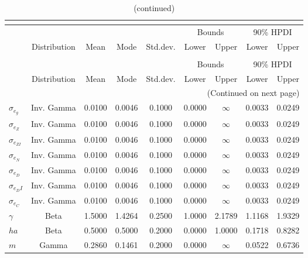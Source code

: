  
\begin{center}
\begin{longtable}{lcccccccc} 
\caption{Prior information (parameters)}\\
 \label{Table:Prior}\\
\toprule%
  &  &  &  &  & \multicolumn{2}{c}{Bounds} & \multicolumn{2}{c}{90\% HPDI} \\ 
  \cmidrule(r{.75em}){6-7} \cmidrule(r{.75em}){8-9}
  & Distribution & Mean & Mode & Std.dev. & Lower & Upper & Lower & Upper  \\ 
\midrule
\endfirsthead
\caption{(continued)}\\
 \toprule%
  &  &  &  &  & \multicolumn{2}{c}{Bounds} & \multicolumn{2}{c}{90\% HPDI} \\ 
  \cmidrule(r{.75em}){6-7} \cmidrule(r{.75em}){8-9}
  & Distribution & Mean & Mode & Std.dev. & Lower & Upper & Lower & Upper  \\ 
\midrule
\endhead
\midrule
\multicolumn{9}{r}{(Continued on next page)} \\ 
\bottomrule
\endfoot
\bottomrule
\endlastfoot
$ \sigma_{{e_g}} $ & Inv. Gamma & 0.0100 & 0.0046 & 0.1000 & 0.0000 & $\infty$ & 0.0033 & 0.0249 \\ 
$ \sigma_{{e_Z}} $ & Inv. Gamma & 0.0100 & 0.0046 & 0.1000 & 0.0000 & $\infty$ & 0.0033 & 0.0249 \\ 
$ \sigma_{{e_{ZI}}} $ & Inv. Gamma & 0.0100 & 0.0046 & 0.1000 & 0.0000 & $\infty$ & 0.0033 & 0.0249 \\ 
$ \sigma_{{e_N}} $ & Inv. Gamma & 0.0100 & 0.0046 & 0.1000 & 0.0000 & $\infty$ & 0.0033 & 0.0249 \\ 
$ \sigma_{{e_D}} $ & Inv. Gamma & 0.0100 & 0.0046 & 0.1000 & 0.0000 & $\infty$ & 0.0033 & 0.0249 \\ 
$ \sigma_{{e_DI}} $ & Inv. Gamma & 0.0100 & 0.0046 & 0.1000 & 0.0000 & $\infty$ & 0.0033 & 0.0249 \\ 
$ \sigma_{{e_C}} $ & Inv. Gamma & 0.0100 & 0.0046 & 0.1000 & 0.0000 & $\infty$ & 0.0033 & 0.0249 \\ 
$ {\gamma} $ & Beta & 1.5000 & 1.4264 & 0.2500 & 1.0000 & 2.1789 & 1.1168 & 1.9329 \\ 
$ {ha} $ & Beta & 0.5000 & 0.5000 & 0.2000 & 0.0000 & 1.0000 & 0.1718 & 0.8282 \\ 
$ {m} $ & Gamma & 0.2860 & 0.1461 & 0.2000 & 0.0000 & $\infty$ & 0.0522 & 0.6736 \\ 

\end{longtable}
\end{center}
